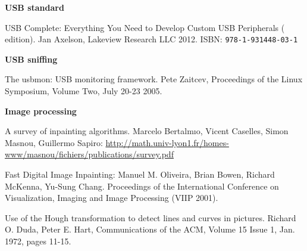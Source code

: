 \documentclass{article}
\begin{document}
\pagebreak

\renewcommand{\refname}{References}
\begin{thebibliography}{}

  \item[]\hspace{-\labelwidth}\hspace{-\labelsep}\textbf{USB standard}

   USB Complete: Everything You Need to Develop
               Custom USB Peripherals ( edition).
               Jan Axelson, Lakeview Research LLC 2012.
               ISBN: {\tt   978-1-931448-03-1}
               
  \item[]\hspace{-\labelwidth}\hspace{-\labelsep}\textbf{USB sniffing}
  
   The usbmon: USB monitoring framework. Pete Zaitcev,
  Proceedings of the Linux Symposium, Volume Two, July 20-23 2005.
  
  \item[]\hspace{-\labelwidth}\hspace{-\labelsep}\textbf{Image processing}
  
   A survey of inpainting algorithms. Marcelo Bertalmıo, Vicent Caselles, Simon Masnou,
  Guillermo Sapiro:
  \url{http://math.univ-lyon1.fr/homes-www/masnou/fichiers/publications/survey.pdf}
  
   Fast Digital Image Inpainting: Manuel M. Oliveira, Brian Bowen, Richard McKenna, Yu-Sung Chang. Proceedings of the International Conference on Visualization, Imaging and Image Processing (VIIP 2001).
  
   Use of the Hough transformation to detect lines and curves in pictures.
  Richard O. Duda, Peter E. Hart, Communications of the ACM, Volume 15 Issue 1, Jan. 1972,
  pages 11-15.
  
  \setcounter{firstbib}{\value{enumiv}}
\end{thebibliography}
\end{document}

